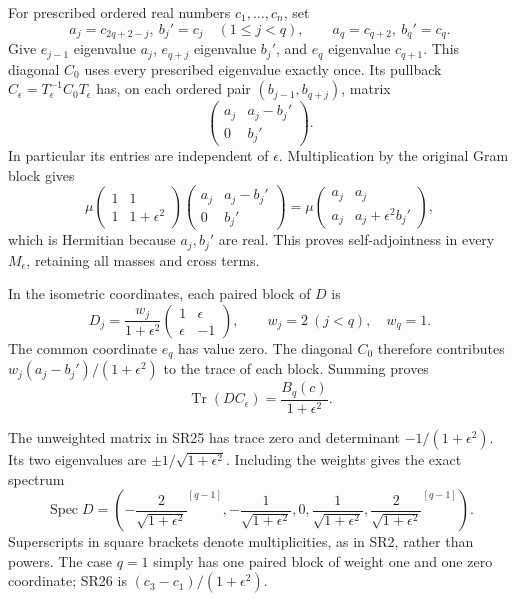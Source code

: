 \documentclass{article}
\begin{document}
For prescribed ordered real numbers \(c_1,\ldots,c_n\), set \[
a_j=c_{2q+2-j},\ b_j'=c_j\quad(1\le j<q),\qquad
a_q=c_{q+2},\ b_q'=c_q.
\tag{SR22}
\] Give \(e_{j-1}\) eigenvalue \(a_j\), \(e_{q+j}\) eigenvalue \(b_j'\), and \(e_q\) eigenvalue \(c_{q+1}\). This diagonal \(C_0\) uses every prescribed eigenvalue exactly once. Its pullback \(C_\epsilon=T_\epsilon^{-1}C_0T_\epsilon\) has, on each ordered pair \((b_{j-1},b_{q+j})\), matrix \[
\begin{pmatrix}a_j&a_j-b_j'\\0&b_j'\end{pmatrix}.
\tag{SR23}
\] In particular its entries are independent of \(\epsilon\). Multiplication by the original Gram block gives \[
\mu\begin{pmatrix}1&1\\1&1+\epsilon^2\end{pmatrix}
\begin{pmatrix}a_j&a_j-b_j'\\0&b_j'\end{pmatrix}
=\mu\begin{pmatrix}a_j&a_j\\a_j&a_j+\epsilon^2b_j'\end{pmatrix},
\tag{SR24}
\] which is Hermitian because \(a_j,b_j'\) are real. This proves self-adjointness in every \(M_\epsilon\), retaining all masses and cross terms.

In the isometric coordinates, each paired block of \(D\) is \[
D_j=\frac{w_j}{1+\epsilon^2}
\begin{pmatrix}1&\epsilon\\\epsilon&-1\end{pmatrix},\qquad
w_j=2\ (j<q),\quad w_q=1.
\tag{SR25}
\] The common coordinate \(e_q\) has value zero. The diagonal \(C_0\) therefore contributes \(w_j(a_j-b_j')/(1+\epsilon^2)\) to the trace of each block. Summing proves \[
\operatorname{Tr}(DC_\epsilon)=\frac{B_q(c)}{1+\epsilon^2}.
\tag{SR26}
\]

The unweighted matrix in SR25 has trace zero and determinant \(-1/(1+\epsilon^2)\). Its two eigenvalues are \(\pm1/\sqrt{1+\epsilon^2}\). Including the weights gives the exact spectrum \[
\operatorname{Spec}D
=\left(
-\frac{2}{\sqrt{1+\epsilon^2}}^{[q-1]},
-\frac{1}{\sqrt{1+\epsilon^2}},0,
\frac{1}{\sqrt{1+\epsilon^2}},
\frac{2}{\sqrt{1+\epsilon^2}}^{[q-1]}
\right).
\tag{SR27}
\] Superscripts in square brackets denote multiplicities, as in SR2, rather than powers. The case \(q=1\) simply has one paired block of weight one and one zero coordinate; SR26 is \((c_3-c_1)/(1+\epsilon^2)\).
\end{document}
